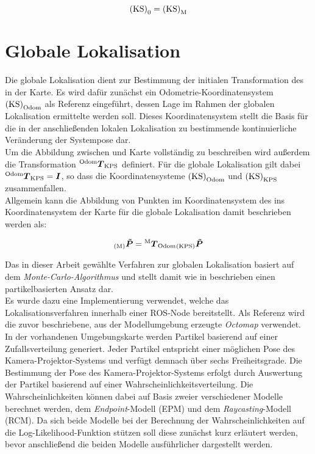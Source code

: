 \begin{equation}
{\mathrm{(KS)}}_{\mathrm{0}} = {\mathrm{(KS)}}_{\mathrm{M}}
\end{equation}

\section{Globale Lokalisation}
\label{chap.globloc}
Die globale Lokalisation dient zur Bestimmung der initialen Transformation des  in der Karte. Es wird dafür zunächst ein Odometrie-Koordinatensystem ${\mathrm{(KS)}}_{\mathrm{Odom}}$ als Referenz eingeführt, dessen Lage im Rahmen der globalen Lokalisation ermittelte werden soll. Dieses Koordinatensystem stellt die Basis für die in der anschließenden lokalen Lokalisation zu bestimmende kontinuierliche Veränderung der Systempose dar.\\
Um die Abbildung zwischen \kps{} und Karte vollständig zu beschreiben wird außerdem die Transformation ${^{\mathrm{Odom}}\mbox{\boldmath{$T$}}_{\mathrm{KPS}}}$ definiert. Für die globale Lokalisation gilt dabei ${^{\mathrm{Odom}}\mbox{\boldmath{$T$}}_{\mathrm{KPS}}} = \mbox{\boldmath{$I$}}$, so dass die Koordinatensysteme ${\mathrm{(KS)}}_{\mathrm{Odom}}$ und ${\mathrm{(KS)}}_{\mathrm{KPS}}$ zusammenfallen.\\
Allgemein kann die Abbildung von Punkten im Koordinatensystem des  ins Koordinatensystem der Karte für die globale Lokalisation damit beschrieben werden als:

\begin{equation}
{_{{\mathrm{(M)}}}}\mbox{\boldmath{$\tilde{P}$}} = {^{\mathrm{M}}\mbox{\boldmath{$T$}}_{\mathrm{Odom}}}{_{{\mathrm{(KPS)}}}}\mbox{\boldmath{$\tilde{P}$}}
\label{eq.globloc}
\end{equation}


Das in dieser Arbeit gewählte Verfahren zur globalen Lokalisation basiert auf dem \textit{Monte-Carlo-Algorithmus} \cite{Dellaert1999} und stellt damit wie in  beschrieben einen partikelbasierten Ansatz dar.\\
Es wurde dazu eine Implementierung \cite{humanoidNavigation} verwendet, welche das Lokalisationsverfahren innerhalb einer ROS-Node bereitstellt. Als Referenz wird die zuvor beschriebene, aus der Modellumgebung erzeugte \textit{Octomap} verwendet.\\


In der vorhandenen Umgebungskarte werden Partikel basierend auf einer Zufallsverteilung generiert. Jeder Partikel entspricht einer möglichen Pose des Kamera-Projektor-Systems und verfügt demnach über sechs Freiheitsgrade. Die Bestimmung der Pose des Kamera-Projektor-Systems erfolgt durch Auswertung der Partikel basierend auf einer Wahrscheinlichkeitsverteilung. Die Wahrscheinlichkeiten können dabei auf Basis zweier verschiedener Modelle berechnet werden, dem \textit{Endpoint}-Modell (EPM) und dem \textit{Raycasting}-Modell (RCM). Da sich beide Modelle bei der Berechnung der Wahrscheinlichkeiten auf die Log-Likelihood-Funktion stützen soll diese zunächst kurz erläutert werden, bevor anschließend die beiden Modelle ausführlicher dargestellt werden.

